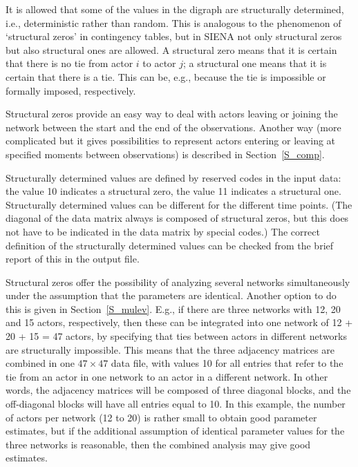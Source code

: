 \documentclass[a4paper,fleqn]{article}
\newcommand{\+}{\, + \,}
\newcommand{\SI}{{\sf SIENA }}
\begin{document}
{It is allowed that some of the values in the digraph are
structurally determined, i.e., deterministic rather than random.
This is analogous to the phenomenon of `structural zeros' in
contingency tables, but in \SI not only structural zeros but also
structural ones are allowed. A structural zero means that it is
certain that there is no tie from actor $i$ to actor $j$; a
structural one means that it is certain that there is a tie. This
can be, e.g., because the tie is impossible or formally imposed,
respectively.

Structural zeros provide an easy way to deal with actors leaving
or joining the network between the start and the end
of the observations. Another way
(more complicated but it gives possibilities to represent actors
entering or leaving at specified moments between observations)
is described in Section~\ref{S_comp}.

Structurally determined values are defined by reserved codes in
the input data: the value 10 indicates a structural zero, the
value 11 indicates a structural one. Structurally determined
values can be different for the different time points. (The
diagonal of the data matrix always is composed of structural
zeros, but this does not have to be indicated in the data matrix
by special codes.) The correct definition of the structurally
determined values can be checked from the brief report of this in
the output file.

Structural zeros offer the possibility of analyzing several
networks simultaneously under the assumption that the parameters
are identical.
Another option to do this is given in Section~\ref{S_mulev}.
E.g., if there are three networks with 12, 20 and
15 actors, respectively, then these can be integrated into one
network of 12 + 20 + 15 = 47 actors, by specifying that ties
between actors in different networks are structurally impossible.
This means that the three adjacency matrices are combined in one
$47 \times 47$ data file, with values 10 for all entries that
refer to the tie from an actor in one network to an actor in a
different network. In other words, the adjacency matrices will be
composed of three diagonal blocks, and the off-diagonal blocks
will have all entries equal to 10. In this example, the number of
actors per network (12 to 20) is rather small to obtain good
parameter estimates, but if the additional assumption of identical
parameter values for the three networks is reasonable, then the
combined analysis may give good estimates.

}
\end{document}
